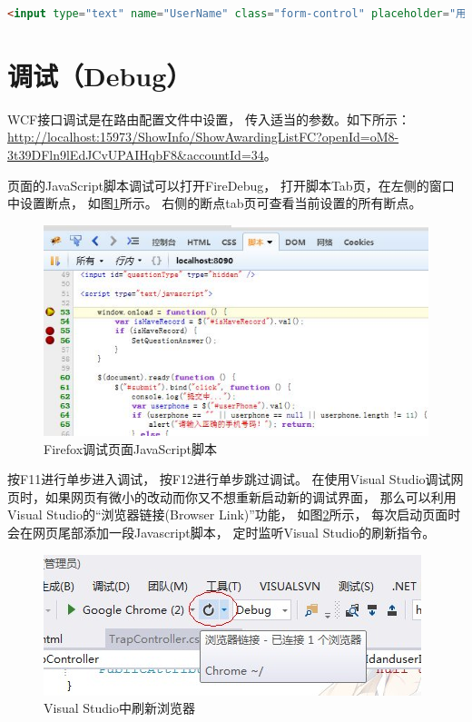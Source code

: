 \documentclass{book}
\begin{document}
\begin{lstlisting}[language=HTML]
<input type="text" name="UserName" class="form-control" placeholder="用户唯一ID"/>
\end{lstlisting}

\section{调试（Debug）}

WCF接口调试是在路由配置文件中设置，
传入适当的参数。如下所示：
\url{http://localhost:15973/ShowInfo/ShowAwardingListFC?openId=oM8-3t39DFln9lEdJCvUPAIHqbF8&accountId=34}。

页面的JavaScript脚本调试可以打开FireDebug，
打开脚本Tab页，在左侧的窗口中设置断点，
如图\ref{fig:FirefoxDebugPage}所示。
右侧的断点tab页可查看当前设置的所有断点。

\begin{figure}[htbp]
	\centering
	\includegraphics[scale=0.8]{FirefoxDebugPage.jpg}
	\caption{Firefox调试页面JavaScript脚本}
	\label{fig:FirefoxDebugPage}
\end{figure}

按F11进行单步进入调试，
按F12进行单步跳过调试。
在使用Visual Studio调试网页时，如果网页有微小的改动而你又不想重新启动新的调试界面，
那么可以利用Visual Studio的“浏览器链接(Browser Link)”功能，
如图\ref{fig:VisualStudioBrowserLink}所示，
每次启动页面时会在网页尾部添加一段Javascript脚本，
定时监听Visual Studio的刷新指令。

\begin{figure}[htbp]
	\centering
	\includegraphics[scale=0.8]{VisualStudioBrowserLink.jpg}
	\caption{Visual Studio中刷新浏览器}
	\label{fig:VisualStudioBrowserLink}
\end{figure}
\end{document}
